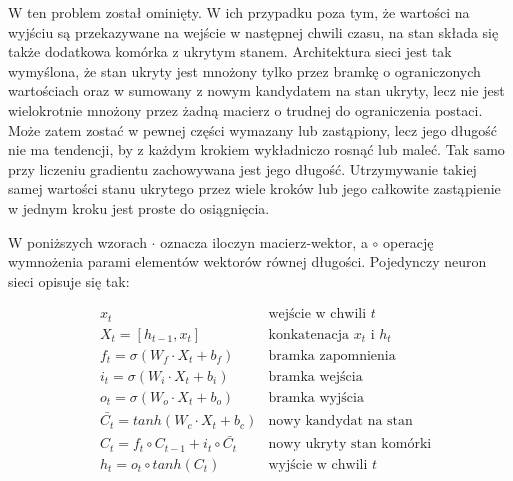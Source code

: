 W  ten problem został ominięty. W ich przypadku poza tym, że wartości na wyjściu są przekazywane
na wejście w następnej chwili czasu, na stan składa się także dodatkowa komórka z ukrytym stanem.
Architektura sieci jest tak wymyślona, że stan ukryty jest mnożony tylko przez bramkę o ograniczonych wartościach
oraz w sumowany z nowym kandydatem na stan ukryty, lecz nie jest wielokrotnie mnożony przez żadną macierz o
trudnej do ograniczenia postaci. Może zatem zostać w pewnej części wymazany lub zastąpiony, lecz jego długość
nie ma tendencji, by z każdym krokiem wykładniczo rosnąć lub maleć. Tak samo przy liczeniu gradientu
zachowywana jest jego długość. Utrzymywanie takiej samej wartości stanu ukrytego przez wiele kroków lub
jego całkowite zastąpienie w jednym kroku jest proste do osiągnięcia.

W poniższych wzorach $\cdot$ oznacza iloczyn macierz-wektor, a $\circ$ operację wymnożenia parami
elementów wektorów równej długości. Pojedynczy neuron sieci  opisuje się tak:

\begin{align*}
& x_t & \text{wejście w chwili } t\\
& X_t = [h_{t-1}, x_t] & \text{konkatenacja } x_t \text{ i } h_t\\
& f_t = \sigma(W_f \cdot X_t + b_f) & \text{bramka zapomnienia}\\
& i_t = \sigma(W_i \cdot X_t + b_i) & \text{bramka wejścia}\\
& o_t = \sigma(W_o \cdot X_t + b_o) & \text{bramka wyjścia}\\
& \bar{C_t} = tanh(W_c \cdot X_t + b_c) & \text{nowy kandydat na stan}\\
& C_t = f_t \circ C_{t-1} + i_t \circ \bar{C_t} & \text{nowy ukryty stan komórki}\\
& h_t = o_t \circ tanh(C_t) & \text{wyjście w chwili } t
\end{align*}

